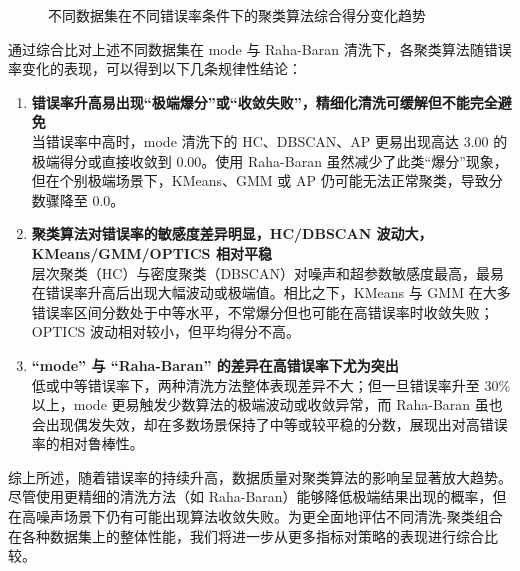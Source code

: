 \documentclass[10pt]{article} %
\numberwithin{equation}{section}
\begin{document}
\begin{figure}[htbp]
  \caption{不同数据集在不同错误率条件下的聚类算法综合得分变化趋势}
  \label{fig:all_combined_scores}
\end{figure}

\noindent

通过综合比对上述不同数据集在 mode 与 Raha-Baran 清洗下，各聚类算法随错误率变化的表现，可以得到以下几条规律性结论：

\begin{enumerate}
    \item \textbf{错误率升高易出现“极端爆分”或“收敛失败”，精细化清洗可缓解但不能完全避免} \\
    当错误率中高时，mode 清洗下的 HC、DBSCAN、AP 更易出现高达 3.00 的极端得分或直接收敛到 0.00。使用 Raha-Baran 虽然减少了此类“爆分”现象，但在个别极端场景下，KMeans、GMM 或 AP 仍可能无法正常聚类，导致分数骤降至 0.0。

    \item \textbf{聚类算法对错误率的敏感度差异明显，HC/DBSCAN 波动大，KMeans/GMM/OPTICS 相对平稳} \\
    层次聚类（HC）与密度聚类（DBSCAN）对噪声和超参数敏感度最高，最易在错误率升高后出现大幅波动或极端值。相比之下，KMeans 与 GMM 在大多错误率区间分数处于中等水平，不常爆分但也可能在高错误率时收敛失败；OPTICS 波动相对较小，但平均得分不高。

    \item \textbf{“mode” 与 “Raha-Baran” 的差异在高错误率下尤为突出} \\
    低或中等错误率下，两种清洗方法整体表现差异不大；但一旦错误率升至 30\% 以上，mode 更易触发少数算法的极端波动或收敛异常，而 Raha-Baran 虽也会出现偶发失效，却在多数场景保持了中等或较平稳的分数，展现出对高错误率的相对鲁棒性。
\end{enumerate}

\noindent
综上所述，随着错误率的持续升高，数据质量对聚类算法的影响呈显著放大趋势。尽管使用更精细的清洗方法（如 Raha-Baran）能够降低极端结果出现的概率，但在高噪声场景下仍有可能出现算法收敛失败。为更全面地评估不同清洗-聚类组合在各种数据集上的整体性能，我们将进一步从更多指标对策略的表现进行综合比较。
\end{document}
